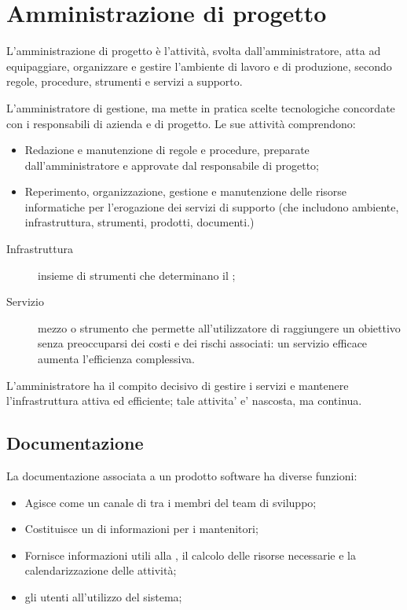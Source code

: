 \section{Amministrazione di progetto}

L'amministrazione di progetto è l'attività, svolta dall'amministratore, atta ad
equipaggiare, organizzare e gestire l'ambiente di lavoro e di produzione,
secondo regole, procedure, strumenti e servizi a supporto.

L'amministratore  di gestione, ma mette in pratica
scelte tecnologiche concordate con i responsabili di azienda e di progetto. Le
sue attività comprendono:

\begin{itemize}
  \item Redazione e manutenzione di regole e procedure, preparate
  	dall'amministratore e approvate dal responsabile di progetto;
  \item Reperimento, organizzazione, gestione e manutenzione delle risorse
  	informatiche per l'erogazione dei servizi di supporto (che includono
  	ambiente, infrastruttura, strumenti, prodotti, documenti.)
\end{itemize}

\begin{description}
  \item[Infrastruttura] insieme di strumenti che determinano il
    ;
  \item[Servizio] mezzo o strumento che permette all'utilizzatore di raggiungere
    un obiettivo senza preoccuparsi dei costi e dei rischi associati: un
    servizio efficace aumenta l'efficienza complessiva.
\end{description}

L'amministratore ha il compito decisivo di gestire i servizi e mantenere
l'infrastruttura attiva ed efficiente; tale attivita' e' nascosta, ma continua.

\subsection{Documentazione}

La documentazione associata a un prodotto software ha diverse funzioni:

\begin{itemize}
	\item Agisce come un canale di  tra i membri del team di
    sviluppo;
	\item Costituisce un  di informazioni per i
    mantenitori;
  \item Fornisce informazioni utili alla , il calcolo
    delle risorse necessarie e la calendarizzazione delle attività;
	\item {} gli utenti all'utilizzo del sistema;
\end{itemize}

